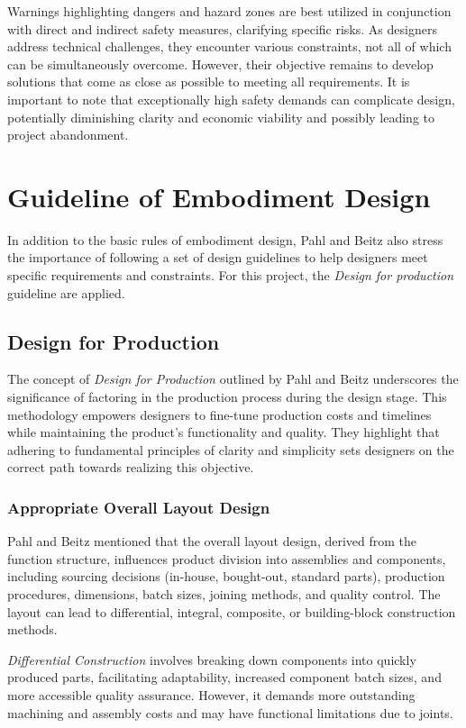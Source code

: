 Warnings highlighting dangers and hazard zones are best utilized in conjunction with direct and indirect safety measures, clarifying specific risks. As designers address technical challenges, they encounter various constraints, not all of which can be simultaneously overcome. However, their objective remains to develop solutions that come as close as possible to meeting all requirements. It is important to note that exceptionally high safety demands can complicate design, potentially diminishing clarity and economic viability and possibly leading to project abandonment.

\section{Guideline of Embodiment Design}
In addition to the basic rules of embodiment design, Pahl and Beitz \cite[308]{Pahl2007} also stress the importance of following a set of design guidelines to help designers meet specific requirements and constraints. For this project, the \textit{Design for production} guideline are applied.

\subsection{Design for Production}
The concept of \textit{Design for Production} outlined by Pahl and Beitz \cite[355-356]{Pahl2007} underscores the significance of factoring in the production process during the design stage. This methodology empowers designers to fine-tune production costs and timelines while maintaining the product's functionality and quality. They highlight that adhering to fundamental principles of clarity and simplicity sets designers on the correct path towards realizing this objective.

\subsubsection{Appropriate Overall Layout Design}
Pahl and Beitz \cite[355-362]{Pahl2007} mentioned that the overall layout design, derived from the function structure, influences product division into assemblies and components, including sourcing decisions (in-house, bought-out, standard parts), production procedures, dimensions, batch sizes, joining methods, and quality control. The layout can lead to differential, integral, composite, or building-block construction methods.

\textit{Differential Construction} involves breaking down components into quickly produced parts, facilitating adaptability, increased component batch sizes, and more accessible quality assurance. However, it demands more outstanding machining and assembly costs and may have functional limitations due to joints.


